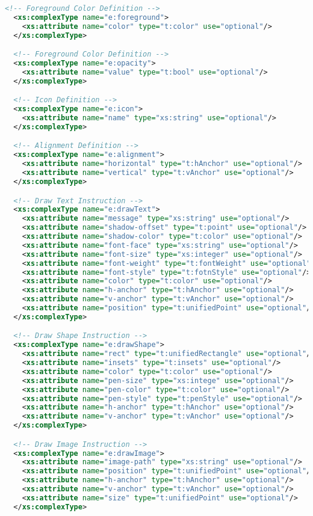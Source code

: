 \begin{lstlisting}[language=XML]
  <!-- Foreground Color Definition -->
  <xs:complexType name="e:foreground">
    <xs:attribute name="color" type="t:color" use="optional"/>
  </xs:complexType>

  <!-- Foreground Color Definition -->
  <xs:complexType name="e:opacity">
    <xs:attribute name="value" type="t:bool" use="optional"/>
  </xs:complexType>

  <!-- Icon Definition -->
  <xs:complexType name="e:icon">
    <xs:attribute name="name" type="xs:string" use="optional"/>
  </xs:complexType>

  <!-- Alignment Definition -->
  <xs:complexType name="e:alignment">
    <xs:attribute name="horizontal" type="t:hAnchor" use="optional"/>
    <xs:attribute name="vertical" type="t:vAnchor" use="optional"/>
  </xs:complexType>

  <!-- Draw Text Instruction -->
  <xs:complexType name="e:drawText">
    <xs:attribute name="message" type="xs:string" use="optional"/>
    <xs:attribute name="shadow-offset" type="t:point" use="optional"/>
    <xs:attribute name="shadow-color" type="t:color" use="optional"/>
    <xs:attribute name="font-face" type="xs:string" use="optional"/>
    <xs:attribute name="font-size" type="xs:integer" use="optional"/>
    <xs:attribute name="font-weight" type="t:fontWeight" use="optional"/>
    <xs:attribute name="font-style" type="t:fotnStyle" use="optional"/>
    <xs:attribute name="color" type="t:color" use="optional"/>
    <xs:attribute name="h-anchor" type="t:hAnchor" use="optional"/>
    <xs:attribute name="v-anchor" type="t:vAnchor" use="optional"/>
    <xs:attribute name="position" type="t:unifiedPoint" use="optional"/>
  </xs:complexType>

  <!-- Draw Shape Instruction -->
  <xs:complexType name="e:drawShape">
    <xs:attribute name="rect" type="t:unifiedRectangle" use="optional"/>
    <xs:attribute name="insets" type="t:insets" use="optional"/>
    <xs:attribute name="color" type="t:color" use="optional"/>
    <xs:attribute name="pen-size" type="xs:intege" use="optional"/>
    <xs:attribute name="pen-color" type="t:color" use="optional"/>
    <xs:attribute name="pen-style" type="t:penStyle" use="optional"/>
    <xs:attribute name="h-anchor" type="t:hAnchor" use="optional"/>
    <xs:attribute name="v-anchor" type="t:vAnchor" use="optional"/>
  </xs:complexType>

  <!-- Draw Image Instruction -->
  <xs:complexType name="e:drawImage">
    <xs:attribute name="image-path" type="xs:string" use="optional"/>
    <xs:attribute name="position" type="t:unifiedPoint" use="optional"/>
    <xs:attribute name="h-anchor" type="t:hAnchor" use="optional"/>
    <xs:attribute name="v-anchor" type="t:vAnchor" use="optional"/>
    <xs:attribute name="size" type="t:unifiedPoint" use="optional"/>
  </xs:complexType>


\end{lstlisting}
